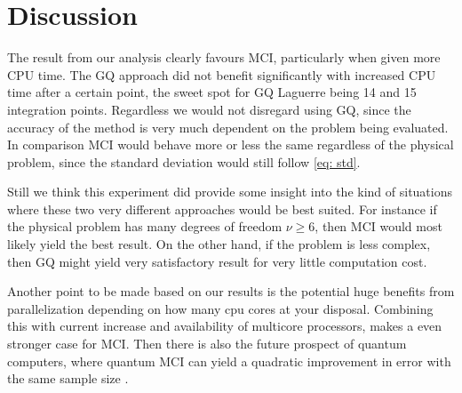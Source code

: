 \section{Discussion}
The result from our analysis clearly favours MCI, particularly when
given more CPU time. The GQ approach did not benefit significantly with
increased
CPU time after a certain point, the sweet spot for GQ Laguerre being 14 and 15
integration points. Regardless we would not disregard using GQ, since the
accuracy of the method is very much dependent on the problem being evaluated.
In comparison MCI would behave more or less the same regardless of the physical
problem, since the standard deviation would still follow \cref{eq: std}.

Still we think this experiment did provide some insight into the kind of
situations where
these two very different approaches would be best suited. For instance if the
physical problem has many degrees of freedom $\nu \ge 6 $, then MCI would most
likely yield the best result. On the other hand, if the problem is less complex,
then GQ might yield very satisfactory result for very little computation cost.

Another point to be made based on our results is the potential huge benefits
from parallelization depending on how many cpu cores at your disposal. Combining
this with current increase and availability of multicore processors, makes a
even stronger case for MCI.
Then there is also the future prospect of quantum
computers, where quantum MCI can yield a quadratic improvement in error with
the same sample size \parencite{doi:10.1098/rspa.2015.0301}.
